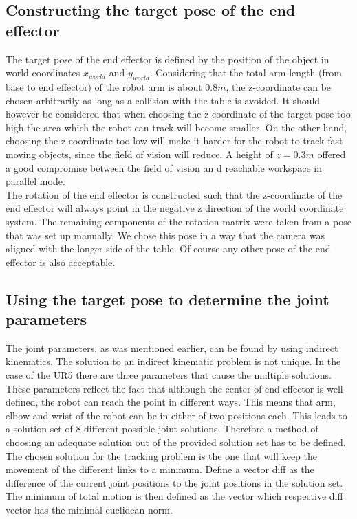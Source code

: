 \documentclass[letterpaper, 10 pt, conference]{ieeeconf}  %
\begin{document}
\subsection{Constructing the target pose of the end effector}
The target pose of the end effector is defined by the position of the object in world coordinates $x_{world}$ and $y_{world}$. Considering that the total arm length (from base to end effector) of the robot arm  is about $0.8m$, the z-coordinate can be chosen arbitrarily as long as a collision with the table is avoided. It should however be considered that when choosing the z-coordinate of the target pose too high the area which the robot can track will become smaller. On the other hand, choosing the z-coordinate too low will make it harder for the robot to track fast moving objects, since the field of vision will reduce. A height of $z=0.3m$ offered a good compromise between the field of vision an d reachable workspace in parallel mode.\\The rotation of the end effector is constructed such that the z-coordinate of the end effector will always point in the negative z direction of the world coordinate system. The remaining components of the rotation matrix were taken from a pose that was set up manually. We chose this pose in a way that the camera was aligned with the longer side of the table. Of course any other pose of the end effector is also acceptable.


\subsection{Using the target pose to determine the joint parameters}

The joint parameters, as was mentioned earlier, can be found by using indirect kinematics. The solution to an indirect kinematic problem is not unique. In the case of the UR5 there are three parameters that cause the multiple solutions. These parameters reflect the fact that although the center of end effector is well defined, the robot can reach the point in different ways. This means that arm, elbow and wrist of the robot can be in either of two positions each. This leads to a solution set of 8 different possible joint solutions.
Therefore a method of choosing an adequate solution out of the provided solution set has to be defined. \\
The chosen solution for the tracking problem is the one that will keep the movement of the different links to a minimum. Define a vector diff as the difference of the current joint positions to the joint positions in the solution set. The minimum of total motion is then defined as the vector which respective diff vector has the minimal euclidean norm. 
\end{document}

